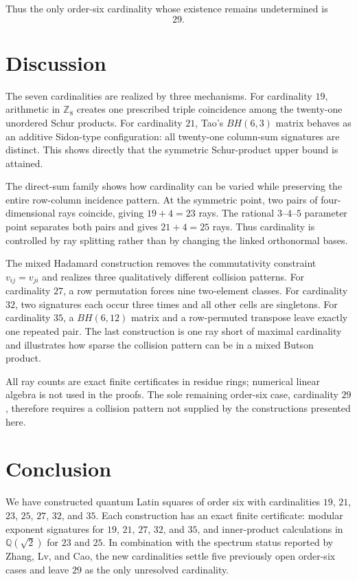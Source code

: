 \documentclass[11pt,a4paper]{article}
\newcommand{\Z}{\mathbb{Z}}
\begin{document}
Thus the only order-six cardinality whose existence remains undetermined is
\[
 \boxed{29}.
\]

\section{Discussion}

The seven cardinalities are realized by three mechanisms.  For cardinality
$19$, arithmetic in $\Z_8$ creates one prescribed triple coincidence among
the twenty-one unordered Schur products.  For cardinality $21$, Tao's
$BH(6,3)$ matrix behaves as an additive Sidon-type configuration: all
twenty-one column-sum signatures are distinct.  This shows directly that the
symmetric Schur-product upper bound is attained.

The direct-sum family shows how cardinality can be varied while preserving the
entire row-column incidence pattern.  At the symmetric point, two pairs of
four-dimensional rays coincide, giving $19+4=23$ rays.  The rational
$3$--$4$--$5$ parameter point separates both pairs and gives $21+4=25$ rays.
Thus cardinality is controlled by ray splitting rather than by changing the
linked orthonormal bases.

The mixed Hadamard construction removes the commutativity constraint
$v_{ij}=v_{ji}$ and realizes three qualitatively different collision patterns.
For cardinality $27$, a row permutation forces nine two-element classes.  For
cardinality $32$, two signatures each occur three times and all other cells are
singletons.  For cardinality $35$, a $BH(6,12)$ matrix and a row-permuted
transpose leave exactly one repeated pair.  The last construction is one ray
short of maximal cardinality and illustrates how sparse the collision pattern
can be in a mixed Butson product.

All ray counts are exact finite certificates in residue rings; numerical
linear algebra is not used in the proofs.  The sole remaining order-six case,
cardinality $29$, therefore requires a collision pattern not supplied by the
constructions presented here.

\section{Conclusion}

We have constructed quantum Latin squares of order six with cardinalities
$19$, $21$, $23$, $25$, $27$, $32$, and $35$.  Each construction has an exact
finite certificate: modular exponent signatures for $19$, $21$, $27$, $32$,
and $35$, and inner-product calculations in $\mathbb Q(\sqrt2)$ for $23$ and
$25$.  In combination with the spectrum status reported by Zhang, Lv, and Cao,
the new cardinalities settle five previously open order-six cases and leave
$29$ as the only unresolved cardinality.
\end{document}
